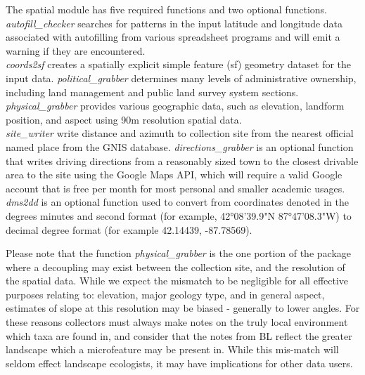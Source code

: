 \documentclass[
]{article}
\begin{document}
The spatial module has five required functions and two optional
functions.\\
\emph{autofill\_checker} searches for patterns in the input latitude and
longitude data associated with autofilling from various spreadsheet
programs and will emit a warning if they are encountered.\\
\emph{coords2sf} creates a spatially explicit simple feature (sf)
geometry dataset for the input data. \emph{political\_grabber}
determines many levels of administrative ownership, including land
management and public land survey system sections.\\
\emph{physical\_grabber} provides various geographic data, such as
elevation, landform position, and aspect using 90m resolution spatial
data.\\
\emph{site\_writer} write distance and azimuth to collection site from
the nearest official named place from the GNIS database.
\emph{directions\_grabber} is an optional function that writes driving
directions from a reasonably sized town to the closest drivable area to
the site using the Google Maps API, which will require a valid Google
account that is free per month for most personal and smaller academic
usages.\\
\emph{dms2dd} is an optional function used to convert from coordinates
denoted in the degrees minutes and second format (for example,
42°08'39.9"N 87°47'08.3"W) to decimal degree format (for example
42.14439, -87.78569).

Please note that the function \emph{physical\_grabber} is the one
portion of the package where a decoupling may exist between the
collection site, and the resolution of the spatial data. While we expect
the mismatch to be negligible for all effective purposes relating to:
elevation, major geology type, and in general aspect, estimates of slope
at this resolution may be biased - generally to lower angles. For these
reasons collectors must always make notes on the truly local environment
which taxa are found in, and consider that the notes from BL reflect the
greater landscape which a microfeature may be present in. While this
mis-match will seldom effect landscape ecologists, it may have
implications for other data users.
\end{document}

